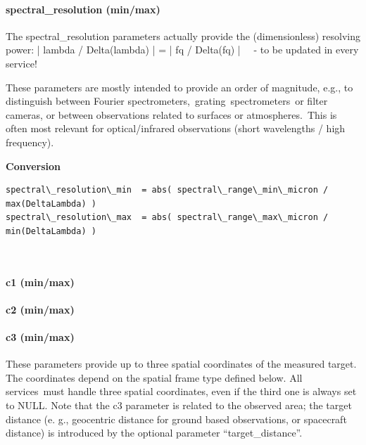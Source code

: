 \documentclass[11pt,a4paper]{ivoa}
\begin{document}
\paragraph{spectral\_resolution (min/max)}

The spectral\_resolution parameters actually provide the (dimensionless) resolving power: | lambda / Delta(lambda) | = | fq / Delta(fq) |   - to be updated in every service!

These parameters are mostly intended to provide an order of magnitude, e.g., to distinguish between Fourier spectrometers, grating spectrometers or filter cameras, or between observations related to surfaces or atmospheres. This is often most relevant for optical/infrared observations (short wavelengths / high frequency).





\textbf{Conversion}




\begin{verbatim}spectral\_resolution\_min  = abs( spectral\_range\_min\_micron / max(DeltaLambda) )
spectral\_resolution\_max  = abs( spectral\_range\_max\_micron / min(DeltaLambda) )\end{verbatim}




\\

\paragraph{c1 (min/max)}

\paragraph{c2 (min/max)}

\paragraph{c3 (min/max)}

These parameters provide up to three spatial coordinates of the measured target. The coordinates depend on the spatial frame type defined below. All services must handle three spatial coordinates, even if the third one is always set to NULL. Note that the c3 parameter is related to the observed area; the target distance (e. g., geocentric distance for ground based observations, or spacecraft distance) is introduced by the optional parameter ``target\_distance''.
\end{document}
